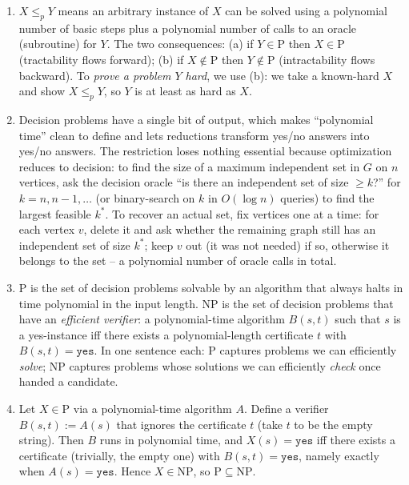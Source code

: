 \documentclass[11pt]{article}
\begin{document}
\begin{enumerate}[label=\textbf{A\arabic*.}, leftmargin=2.2em]

\item $X \le_p Y$ means an arbitrary instance of $X$ can be solved using a polynomial
number of basic steps plus a polynomial number of calls to an oracle (subroutine) for $Y$.
The two consequences: (a) if $Y \in \mathrm{P}$ then $X \in \mathrm{P}$ (tractability flows
forward); (b) if $X \notin \mathrm{P}$ then $Y \notin \mathrm{P}$ (intractability flows
backward). To \emph{prove a problem $Y$ hard}, we use (b): we take a known-hard $X$ and
show $X \le_p Y$, so $Y$ is at least as hard as $X$.

\item Decision problems have a single bit of output, which makes ``polynomial time'' clean
to define and lets reductions transform yes/no answers into yes/no answers. The restriction
loses nothing essential because optimization reduces to decision: to find the size of a
maximum independent set in $G$ on $n$ vertices, ask the decision oracle ``is there an
independent set of size $\ge k$?'' for $k = n, n-1, \ldots$ (or binary-search on $k$ in
$O(\log n)$ queries) to find the largest feasible $k^*$. To recover an actual set, fix
vertices one at a time: for each vertex $v$, delete it and ask whether the remaining graph
still has an independent set of size $k^*$; keep $v$ out (it was not needed) if so,
otherwise it belongs to the set -- a polynomial number of oracle calls in total.

\item $\mathrm{P}$ is the set of decision problems solvable by an algorithm that always
halts in time polynomial in the input length. $\mathrm{NP}$ is the set of decision problems
that have an \emph{efficient verifier}: a polynomial-time algorithm $B(s, t)$ such that $s$
is a yes-instance iff there exists a polynomial-length certificate $t$ with $B(s,t) =
\mathtt{yes}$. In one sentence each: $\mathrm{P}$ captures problems we can efficiently
\emph{solve}; $\mathrm{NP}$ captures problems whose solutions we can efficiently
\emph{check} once handed a candidate.

\item Let $X \in \mathrm{P}$ via a polynomial-time algorithm $A$. Define a verifier $B(s,t)
:= A(s)$ that ignores the certificate $t$ (take $t$ to be the empty string). Then $B$ runs
in polynomial time, and $X(s) = \mathtt{yes}$ iff there exists a certificate (trivially,
the empty one) with $B(s,t) = \mathtt{yes}$, namely exactly when $A(s) = \mathtt{yes}$.
Hence $X \in \mathrm{NP}$, so $\mathrm{P} \subseteq \mathrm{NP}$.


\end{enumerate}
\end{document}
